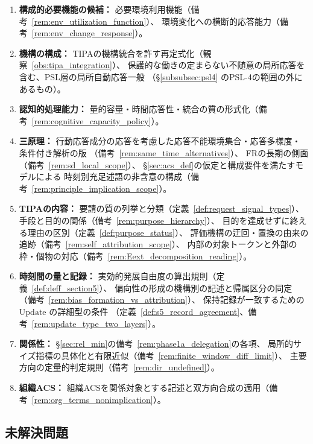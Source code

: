 \begin{enumerate}
  \item \textbf{構成的必要機能の候補：}
  必要環境利用機能（備考~\ref{rem:env_utilization_function}）、
  環境変化への横断的応答能力（備考~\ref{rem:env_change_response}）。
  \item \textbf{機構の構成：}
  TIPAの機構統合を許す再定式化（観察~\ref{obs:tipa_integration}）、
  保護的な働きの定まらない不随意の局所応答を含む、PSL層の局所自動応答一般
  （\S\ref{subsubsec:psl4} のPSL-4の範囲の外にあるもの）。
  \item \textbf{認知的処理能力：}
  量的容量・時間応答性・統合の質の形式化（備考~\ref{rem:cognitive_capacity_policy}）。
  \item \textbf{三原理：}
  行動応答成分の応答を考慮した応答不能環境集合・応答多様度・条件付き解析の版
  （備考~\ref{rem:same_time_alternatives}）、
  FRの長期の側面（備考~\ref{rem:sd_local_scope}）、
  \S\ref{sec:acs_def}の仮定と構成要件を満たすモデルによる
  時刻別充足述語の非含意の構成（備考~\ref{rem:principle_implication_scope}）。
  \item \textbf{TIPAの内容：}
  要請の質の列挙と分類（定義~\ref{def:request_signal_types}）、
  手段と目的の関係（備考~\ref{rem:purpose_hierarchy}）、
  目的を達成せずに終える理由の区別（定義~\ref{def:purpose_status}）、
  評価機構の迂回・置換の由来の追跡（備考~\ref{rem:self_attribution_scope}）、
  内部の対象トークンと外部の枠・個物の対応（備考~\ref{rem:Eext_decomposition_reading}）。
  \item \textbf{時刻間の量と記録：}
  実効的発展自由度の算出規則（定義~\ref{def:deff_section5}）、
  偏向性の形成の機構別の記述と帰属区分の同定（備考~\ref{rem:bias_formation_vs_attribution}）、
  保持記録が一致するための $\mathrm{Update}$ の詳細型の条件
  （定義~\ref{def:s5_record_agreement}、備考~\ref{rem:update_type_two_layers}）。
  \item \textbf{関係性：}
  \S\ref{sec:rel_min}の備考~\ref{rem:phase1a_delegation}の各項、
  局所的サイズ指標の具体化と有限近似（備考~\ref{rem:finite_window_diff_limit}）、
  主要方向の定量的判定規則（備考~\ref{rem:dir_undefined}）。
  \item \textbf{組織ACS：}
  組織ACSを関係対象とする記述と双方向合成の適用（備考~\ref{rem:org_terms_nonimplication}）。
\end{enumerate}

\subsection{未解決問題}
\label{subsec:open_problems}

